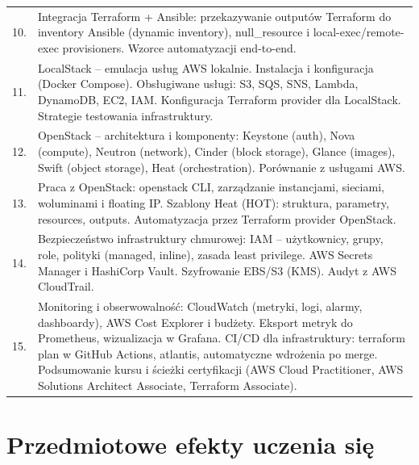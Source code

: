 \documentclass[12pt, a4paper]{article}
\begin{document}
{\begin{longtable}{m{1.5cm}m{14.5cm}}
  \rowcolor{tableRowAlt} 10. & Integracja Terraform + Ansible: przekazywanie outputów Terraform do inventory Ansible (dynamic inventory), null\_resource i local-exec/remote-exec provisioners. Wzorce automatyzacji end-to-end. \\
  \rowcolor{tableRowLight} 11. & LocalStack – emulacja usług AWS lokalnie. Instalacja i konfiguracja (Docker Compose). Obsługiwane usługi: S3, SQS, SNS, Lambda, DynamoDB, EC2, IAM. Konfiguracja Terraform provider dla LocalStack. Strategie testowania infrastruktury. \\
  \rowcolor{tableRowAlt} 12. & OpenStack – architektura i komponenty: Keystone (auth), Nova (compute), Neutron (network), Cinder (block storage), Glance (images), Swift (object storage), Heat (orchestration). Porównanie z usługami AWS. \\
  \rowcolor{tableRowLight} 13. & Praca z OpenStack: openstack CLI, zarządzanie instancjami, sieciami, woluminami i floating IP. Szablony Heat (HOT): struktura, parametry, resources, outputs. Automatyzacja przez Terraform provider OpenStack. \\
  \rowcolor{tableRowAlt} 14. & Bezpieczeństwo infrastruktury chmurowej: IAM – użytkownicy, grupy, role, polityki (managed, inline), zasada least privilege. AWS Secrets Manager i HashiCorp Vault. Szyfrowanie EBS/S3 (KMS). Audyt z AWS CloudTrail. \\
  \rowcolor{tableRowLight} 15. & Monitoring i obserwowalność: CloudWatch (metryki, logi, alarmy, dashboardy), AWS Cost Explorer i budżety. Eksport metryk do Prometheus, wizualizacja w Grafana. CI/CD dla infrastruktury: terraform plan w GitHub Actions, atlantis, automatyczne wdrożenia po merge. Podsumowanie kursu i ścieżki certyfikacji (AWS Cloud Practitioner, AWS Solutions Architect Associate, Terraform Associate). \\
\bottomrule
\end{longtable}}

\section{Przedmiotowe efekty uczenia się}
\end{document}
